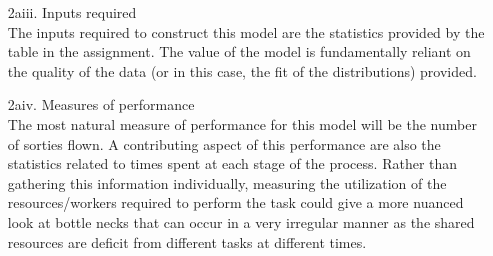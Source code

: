\documentclass[answers]{exam}
\begin{document}
\begin{questions}
\begin{enumerate}
\begin{solution}
\begin{enumerate}
			\item[2aiii.] Inputs required \\
				The inputs required to construct this model are the
				statistics provided by the table in the assignment.
				The value of the model is fundamentally reliant
				on the quality of the data (or in this case, the fit
				of the distributions) provided.
				
			\item[2aiv.] Measures of performance \\
				The most natural measure of performance for this model 
				will be the number of sorties flown.
				A contributing aspect of this performance are also
				the statistics related to times spent at each stage
				of the process.
				Rather than gathering this information individually,
				measuring the utilization of the resources/workers
				required to perform the task could give a more nuanced look
				at bottle necks that can occur in a very irregular manner as
				the shared resources are deficit from different tasks
				at different times.
				

\end{enumerate}
\end{solution}
\end{enumerate}
\end{questions}
\end{document}
